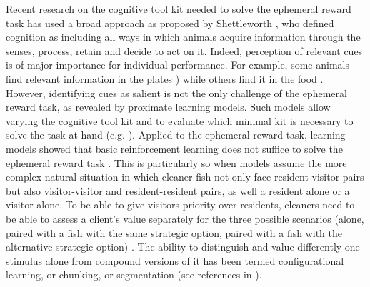 \documentclass[]{rsos}%
\begin{document}
Recent research on the cognitive tool kit needed to solve the ephemeral
reward task has used a broad approach as proposed by Shettleworth
\citep{shettleworth_Cognition_2009}, who defined cognition as including
all ways in which animals acquire information
through the senses, process, retain and decide to act on it.
Indeed, perception of relevant cues is of major importance
for individual performance. For example, some animals find relevant
information in the plates
\citep{wismer_Cuebased_2019}) while others find it in the food
\citep{pretot_Comparative_2021, pretot_Comparing_2016}. However, identifying
cues as salient is not the only challenge of the ephemeral reward task,
as revealed by proximate learning models. Such models allow varying the
cognitive tool kit and to evaluate which minimal kit is necessary to solve
the task at hand (e.g. \citep{dubois_Model_2021}). Applied to the ephemeral
reward task, learning models showed that basic reinforcement learning does
not suffice to solve the ephemeral reward task \citep{prat_Modelling_2022, quinones_Reinforcement_2019}.
This is particularly so when models assume the more complex natural
situation in which cleaner fish not only face resident-visitor pairs but also
visitor-visitor and resident-resident pairs, as well a resident alone or
a visitor alone. To be able to give visitors priority over residents,
cleaners need to be able to assess a client's value separately for the
three possible scenarios (alone, paired with a fish with the
same strategic option, paired with a fish with the alternative strategic option)
\citep{quinones_Reinforcement_2019}. The ability to distinguish and value differently
one stimulus alone from compound versions of it has been termed
configurational learning, or chunking,
or segmentation (see references in \citep{prat_Modelling_2022}).
\end{document}
